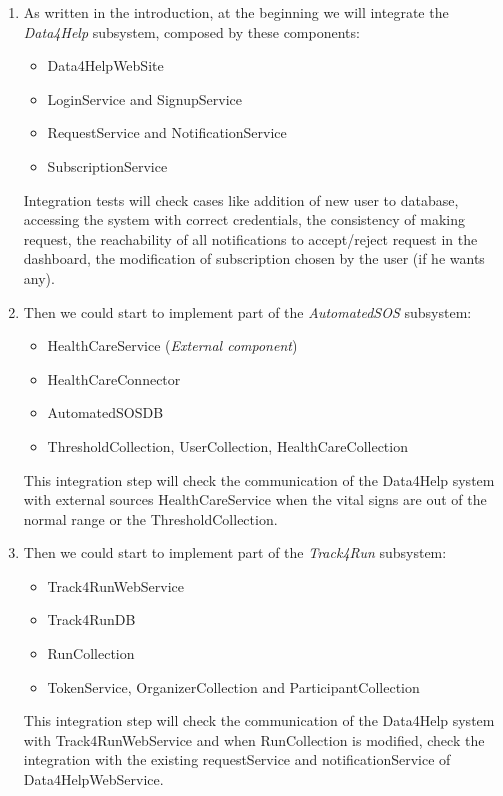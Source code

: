 \documentclass[a4paper, hidelinks, 12pt]{report}
\begin{document}
\begin{enumerate}
\item{} As written in the introduction, at the beginning we will integrate the \textit{Data4Help} subsystem, composed by these components:
\begin{itemize}
\item{} Data4HelpWebSite
\item{} LoginService and SignupService
\item{} RequestService and NotificationService
\item{} SubscriptionService
\end{itemize}

Integration tests will check cases like addition of new user to database, accessing the system with correct credentials, the consistency of making request, the reachability of all notifications to accept/reject request in the dashboard, the modification of subscription chosen by the user (if he wants any).

\item{} Then we could start to implement part of the \textit{AutomatedSOS} subsystem:
\begin{itemize}
\item{} HealthCareService (\textit{External component})
\item{} HealthCareConnector 
\item{} AutomatedSOSDB
\item{} ThresholdCollection, UserCollection, HealthCareCollection
\end{itemize}
This integration step will check the communication of the Data4Help system with external sources HealthCareService when the vital signs are out of the normal range or the ThresholdCollection.

\item{} Then we could start to implement part of the \textit{Track4Run} subsystem:
\begin{itemize}
\item{} Track4RunWebService
\item{} Track4RunDB 
\item{} RunCollection
\item{} TokenService, OrganizerCollection and ParticipantCollection
\end{itemize}
This integration step will check the communication of the Data4Help system with Track4RunWebService and when RunCollection is modified, check the integration with the existing requestService and notificationService of Data4HelpWebService.


\end{enumerate}
\end{document}
